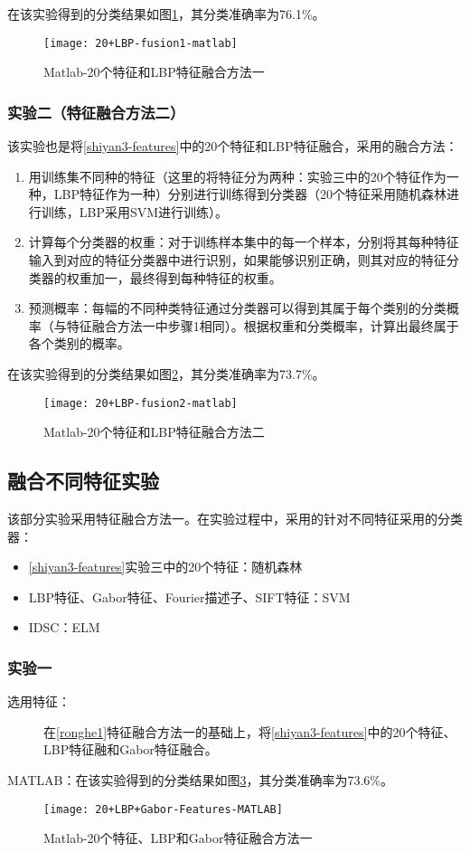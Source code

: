 在该实验得到的分类结果如图\ref{fig:20+LBP-fusion1-matlab}，其分类准确率为76.1\%。
\begin{figure}[!ht]
\centering
\texttt{[image: 20+LBP-fusion1-matlab]}
\caption{Matlab-20个特征和LBP特征融合方法一}
\label{fig:20+LBP-fusion1-matlab}
\end{figure}

\subsubsection{实验二（特征融合方法二）}
该实验也是将\ref{shiyan3-features}中的20个特征和LBP特征融合，采用的融合方法：
\begin{enumerate}
\item 用训练集不同种的特征（这里的将特征分为两种：实验三中的20个特征作为一种，LBP特征作为一种）分别进行训练得到分类器（20个特征采用随机森林进行训练，LBP采用SVM进行训练）。
\item 计算每个分类器的权重：对于训练样本集中的每一个样本，分别将其每种特征输入到对应的特征分类器中进行识别，如果能够识别正确，则其对应的特征分类器的权重加一，最终得到每种特征的权重。
\item 预测概率：每幅的不同种类特征通过分类器可以得到其属于每个类别的分类概率（与特征融合方法一中步骤1相同）。根据权重和分类概率，计算出最终属于各个类别的概率。
\end{enumerate}

在该实验得到的分类结果如图\ref{fig:20+LBP-fusion2-matlab}，其分类准确率为73.7\%。
\begin{figure}[!ht]
\centering
\texttt{[image: 20+LBP-fusion2-matlab]}
\caption{Matlab-20个特征和LBP特征融合方法二}
\label{fig:20+LBP-fusion2-matlab}
\end{figure}

\subsection{融合不同特征实验}
该部分实验采用特征融合方法一。在实验过程中，采用的针对不同特征采用的分类器：
\begin{itemize}
\item \ref{shiyan3-features}实验三中的20个特征：随机森林
\item LBP特征、Gabor特征、Fourier描述子、SIFT特征：SVM
\item IDSC：ELM
\end{itemize}
\subsubsection{实验一}
\begin{description}
\item[选用特征：] 在\ref{ronghe1}特征融合方法一的基础上，将\ref{shiyan3-features}中的20个特征、LBP特征融和Gabor特征融合。
\end{description}
MATLAB：在该实验得到的分类结果如图\ref{fig:20+LBP+Gabor-Features-MATLAB}，其分类准确率为73.6\%。
\begin{figure}[!ht]
\centering
\texttt{[image: 20+LBP+Gabor-Features-MATLAB]}
\caption{Matlab-20个特征、LBP和Gabor特征融合方法一}
\label{fig:20+LBP+Gabor-Features-MATLAB}
\end{figure}

